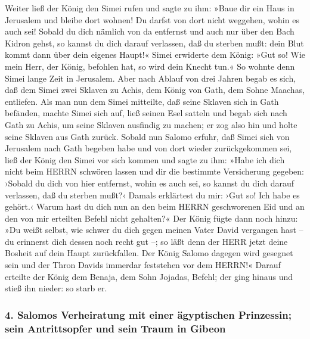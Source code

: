 Weiter ließ der König den Simei rufen und sagte zu ihm:
»Baue dir ein Haus in Jerusalem und bleibe dort wohnen! Du darfst von
dort nicht weggehen, wohin es auch sei! Sobald du dich
nämlich von da entfernst und auch nur über den Bach Kidron gehst, so
kannst du dich darauf verlassen, daß du sterben mußt: dein Blut kommt
dann über dein eigenes Haupt!« Simei erwiderte dem König:
»Gut so! Wie mein Herr, der König, befohlen hat, so wird dein Knecht
tun.« So wohnte denn Simei lange Zeit in Jerusalem. Aber
nach Ablauf von drei Jahren begab es sich, daß dem Simei zwei Sklaven zu
Achis, dem König von Gath, dem Sohne Maachas, entliefen. Als man nun dem
Simei mitteilte, daß seine Sklaven sich in Gath befänden,
machte Simei sich auf, ließ seinen Esel satteln und begab
sich nach Gath zu Achis, um seine Sklaven ausfindig zu machen; er zog
also hin und holte seine Sklaven aus Gath zurück. Sobald
nun Salomo erfuhr, daß Simei sich von Jerusalem nach Gath begeben habe
und von dort wieder zurückgekommen sei, ließ der König
den Simei vor sich kommen und sagte zu ihm: »Habe ich dich nicht beim
HERRN schwören lassen und dir die bestimmte Versicherung gegeben:
›Sobald du dich von hier entfernst, wohin es auch sei, so kannst du dich
darauf verlassen, daß du sterben mußt?‹ Damals erklärtest du mir: ›Gut
so! Ich habe es gehört.‹ Warum hast du dich nun an den
beim HERRN geschworenen Eid und an den von mir erteilten Befehl nicht
gehalten?« Der König fügte dann noch hinzu: »Du weißt
selbst, wie schwer du dich gegen meinen Vater David vergangen hast -- du
erinnerst dich dessen noch recht gut --; so läßt denn der HERR jetzt
deine Bosheit auf dein Haupt zurückfallen. Der König
Salomo dagegen wird gesegnet sein und der Thron Davids immerdar
feststehen vor dem HERRN!« Darauf erteilte der König dem
Benaja, dem Sohn Jojadas, Befehl; der ging hinaus und stieß ihn nieder:
so starb er.

\hypertarget{salomos-verheiratung-mit-einer-uxe4gyptischen-prinzessin-sein-antrittsopfer-und-sein-traum-in-gibeon}{%
\subsubsection{4. Salomos Verheiratung mit einer ägyptischen Prinzessin;
sein Antrittsopfer und sein Traum in
Gibeon}\label{salomos-verheiratung-mit-einer-uxe4gyptischen-prinzessin-sein-antrittsopfer-und-sein-traum-in-gibeon}}

